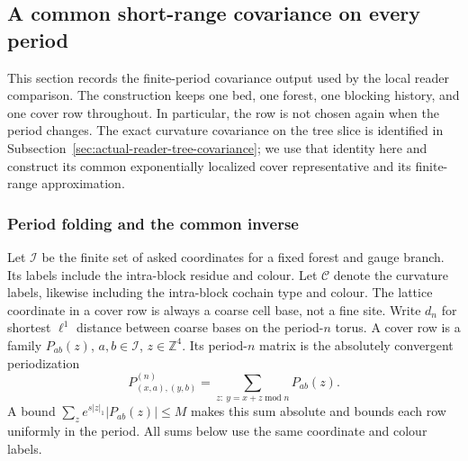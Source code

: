 \subsection{A common short-range covariance on every period}
\label{sec:actual-reader-short-covariance}

This section records the finite-period covariance output used by the local
reader comparison. The construction keeps one bed, one forest, one blocking
history, and one cover row throughout. In particular, the row is not chosen
again when the period changes. The exact curvature covariance on the tree
slice is identified in Subsection~\ref{sec:actual-reader-tree-covariance}; we
use that identity here and construct its common exponentially localized
cover representative and its finite-range approximation.

\subsubsection{Period folding and the common inverse}

Let $\mathcal I$ be the finite set of asked coordinates for a
fixed forest and gauge branch. Its labels include the intra-block residue
and colour. Let $\mathcal C$ denote the curvature labels, likewise
including the intra-block cochain type and colour. The lattice coordinate
in a cover row is always a coarse cell base, not a fine site. Write $d_n$
for shortest $\ell^1$ distance between coarse bases on the period-$n$
torus. A cover row is a family $P_{ab}(z)$, $a,b\in\mathcal I$,
$z\in\mathbb Z^4$. Its period-$n$ matrix
is the absolutely convergent periodization
\[
 P^{(n)}_{(x,a),(y,b)}
   =\sum_{z:\ y=x+z\;\mathrm{mod}\;n}P_{ab}(z).
\]
A bound $\sum_z e^{s|z|_1}|P_{ab}(z)|\le M$ makes this sum absolute and
bounds each row uniformly in the period. All sums below use the same
coordinate and colour labels.

